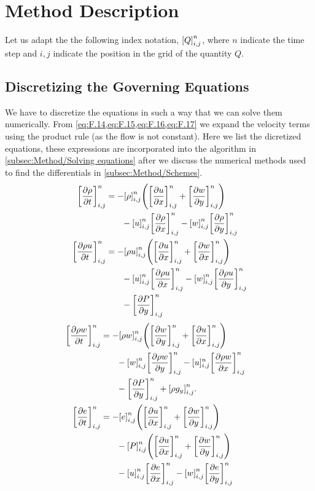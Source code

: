 \documentclass[11pt,a4paper,twocolumn,titlepage]{article}
\newcommand{\disc}[1]    %
{
\ensuremath
\qty[#1]_{i,j}^{n}
}
\begin{document}
\section{Method Description}\label{sec:Method}
Let us adapt the the following index notation, $\disc{Q}$, where $n$ indicate the time step and $i,j$ indicate the position in the grid of the quantity $Q$.

\subsection{Discretizing the Governing Equations}\label{subsec:Method/Discretizing}
We have to discretize the equations in such a way that we can solve them numerically. From \cref{eq:F.14,eq:F.15,eq:F.16,eq:F.17} we expand the velocity terms using the product rule (as the flow is not constant). Here we list the dicretized equations, these expressions are incorporated into the algorithm in \ref{subsec:Method/Solving equations} after we discuss the numerical methods used to find the differentials in \cref{subsec:Method/Schemes}.
{\small
\begin{align}
\disc{\pdv{\rho}{t}} &= -\disc{\rho}\qty(\disc{\pdv{u}{x}}+\disc{\pdv{w}{y}}) \notag\\
&\phantom{{}=1} - \disc{u}\disc{\pdv{\rho}{x}} - \disc{w}\disc{\pdv{\rho}{y}}
\label{eq:Disc rho}
\\
\disc{\pdv{\rho u}{t}} &= -\disc{\rho u}\qty(\disc{\pdv{u}{x}} + \disc{\pdv{w}{x}}) \notag \\
&\phantom{{}=1} - \disc{u}\disc{\pdv{\rho u}{x}} - \disc{w}\disc{\pdv{\rho u}{y}} \notag \\
&\phantom{{}=1} - \disc{\pdv{P}{y}}
\label{eq:Disc rhou}
\end{align}%
\begin{align}
\qty[\pdv{\rho w}{t}]_{i,j}^n &=- \qty[\rho w]_{i,j}^n\qty(\qty[\pdv{w}{y}]_{i,j}^n + \qty[\pdv{u}{x}]_{i,j}^n) \notag\\
&\phantom{{}=1}- \qty[w]_{i,j}^n\qty[\pdv{\rho w}{y}]_{i,j}^n - [u]_{i,j}^n\qty[\pdv{\rho w}{x}]_{i,j}^n \notag\\
&\phantom{{}=1}- \qty[\pdv{P}{y}]_{i,j}^n + \qty[\rho g_y]_{i,j}^n.
\label{eq:Disc rhow}
\\
\qty[\pdv{e}{t}]_{i,j}^n &= -\qty[e]_{i,j}^n\qty(\qty[\pdv{u}{x}]_{i,j}^n +\qty[\pdv{w}{y}]_{i,j}^n) \notag\\
&\phantom{{}=1} - \qty[P]_{i,j}^n\qty(\disc{\pdv{u}{x}} + \disc{\pdv{w}{y}})  \notag\\
&\phantom{{}=1} - \disc{u}\disc{\pdv{e}{x}} - \disc{w}\disc{\pdv{e}{y}} &
\label{eq:Disc e}
\end{align}%
}%
\end{document}
